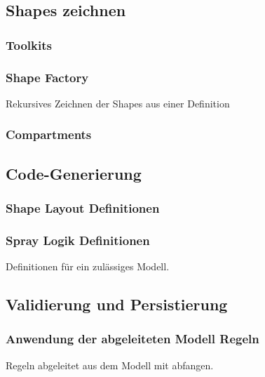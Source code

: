 \subsection{Shapes zeichnen}

\subsubsection{Toolkits}

\subsubsection{\dd}

\citep{dd}

\subsubsection{Shape Factory}

Rekursives Zeichnen der Shapes aus einer Definition

\subsubsection{Compartments}


\subsection{Code-Generierung}

\subsubsection{Shape Layout Definitionen}

\subsubsection{Spray Logik Definitionen}

Definitionen für ein zulässiges Modell.

\subsection{Validierung und Persistierung}

\subsubsection{Anwendung der abgeleiteten Modell Regeln}

Regeln abgeleitet aus dem Modell mit \dd abfangen.

